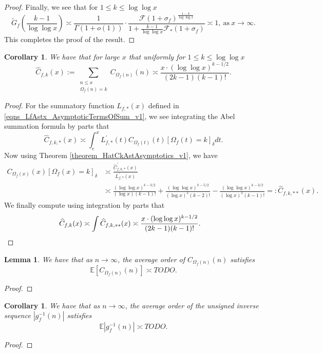 \documentclass[11pt,reqno,a4letter]{article}
\numberwithin{figure}{section}
\numberwithin{table}{section}
\newcommand{\Iverson}[1]{\ensuremath{\left[#1\right]_{\delta}}}
\theoremstyle{plain}
\newtheorem{lemma}[theorem]{Lemma}
\newtheorem{cor}[theorem]{Corollary}
\numberwithin{theorem}{section}
\theoremstyle{definition}
\begin{document}
\begin{proof}
Finally, we see that for $1 \leq k \leq \log\log x$ 
\[
\widetilde{G}_f\left(\frac{k-1}{\log\log x}\right) \asymp \frac{1}{\Gamma(1+o(1))} \cdot 
     \frac{\mathcal{F}(1+\sigma_f)^{\frac{1-k}{\log\log x}}}{1+\frac{k-1}{\log\log x} 
     \mathcal{F}_{\ast}(1+\sigma_f)} \asymp 1, \mathrm{\ as\ } x \rightarrow \infty. 
\]
This completes the proof of the result. 
\end{proof}

\begin{cor}
\label{cor_AvgOrderExpectationFormula_for_COmegafnn_v2} 
We have that for large $x$ that uniformly for $1 \leq k \leq \log\log x$ 
\[
\widehat{C}_{f,k}(x) := 
     \sum_{\substack{n \leq x \\ \Omega_f(n) = k}} C_{\Omega_f(n)}(n) \asymp 
     \frac{x \cdot (\log\log x)^{k-1/2}}{(2k-1) (k-1)!}. 
\]
\end{cor}
\begin{proof}
For the summatory function $L_{f,\ast}(x)$ defined in 
\eqref{eqns_LfAstx_AsymptoticTermsOfSum_v1}, 
we see integrating the Abel summation formula by parts that 
\[
\widehat{C}_{f,k,\ast}(x) \asymp \int_e^{x} L_{f,\ast}^{\prime}(t) 
     C_{\Omega_f(t)}(t) \Iverson{\Omega_f(t) = k} dt. 
\]
Now using Theorem \ref{theorem_HatCkAstAsymptotics_v1}, we have 
\begin{align*}
     C_{\Omega_f(x)}(x) \Iverson{\Omega_f(x) = k} & \asymp 
     \frac{\widehat{C}_{f,k,\ast}^{\prime}(x)}{L_{f,\ast}^{\prime}(x)} \\ 
     & \asymp \frac{(\log\log x)^{k-3/2}}{(\log x)(k-1)!} + 
     \frac{(\log\log x)^{k-5/2}}{(\log x)^2 (k-2)!} - 
     \frac{(\log\log x)^{k-3/2}}{(\log x)^2 (k-1)!} 
     =: \widehat{C}_{f,k,\ast\ast}(x). 
\end{align*} 
We finally compute using integration by parts that 
\begin{align*} 
\widehat{C}_{f,k}(x) & \asymp \int \widehat{C}_{f,k,\ast\ast}(x) 
     \asymp \frac{x \cdot (\log\log x)^{k-1/2}}{(2k-1) (k-1)!}. 
     \qedhere
\end{align*}
\end{proof}

\begin{lemma}
We have that as $n \rightarrow \infty$, the average order of $C_{\Omega_f(n)}(n)$ satisfies 
\[
\mathbb{E}[C_{\Omega_f(n)}(n)] \asymp TODO. 
\]
\end{lemma}
\begin{proof}
\end{proof}

\begin{cor}
\label{cor_ExpectationFormulaAbsgfInvn_v2}
We have that as $n \rightarrow \infty$, the average order of the unsigned inverse sequence 
$|g_f^{-1}(n)|$ satisfies 
\[
\mathbb{E}|g_f^{-1}(n)| \asymp TODO. 
\]
\end{cor}
\begin{proof}
\end{proof}
\end{document}
